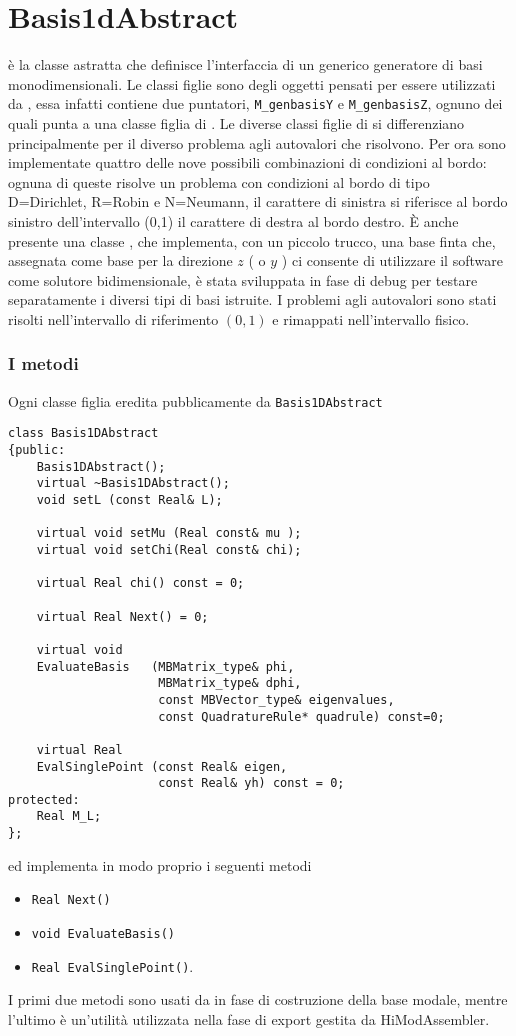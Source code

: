 \section{Basis1dAbstract}
 \`e la classe astratta che definisce l'interfaccia di un generico generatore di basi monodimensionali.
Le classi figlie sono degli oggetti pensati per essere utilizzati da , essa infatti contiene due puntatori, 
\texttt{M\_genbasisY} e \texttt{M\_genbasisZ}, ognuno dei quali punta a una classe figlia di .
Le diverse classi figlie di  si differenziano principalmente per il diverso problema agli autovalori che risolvono.
Per ora sono implementate quattro delle nove possibili combinazioni di condizioni al bordo:  
ognuna di queste risolve un problema con condizioni al bordo di tipo D=Dirichlet, R=Robin e N=Neumann, il carattere di sinistra 
si riferisce al bordo sinistro dell'intervallo (0,1) il carattere di destra al bordo destro. \`E anche presente una 
classe , che implementa, con un piccolo trucco, una base finta che, assegnata come base per la direzione
$z$ ( o $y$ ) ci consente di utilizzare il software come solutore bidimensionale, \`e stata sviluppata in fase di debug 
per testare separatamente i diversi tipi di basi istruite.
I problemi agli autovalori sono stati risolti nell'intervallo di riferimento $(0,1)$ e rimappati nell'intervallo fisico.
 
\subsubsection{I metodi}
Ogni classe figlia eredita pubblicamente da \texttt{Basis1DAbstract}
\begin{lstlisting}[style = general]
class Basis1DAbstract
{public:
    Basis1DAbstract();
    virtual ~Basis1DAbstract();
    void setL (const Real& L);
    
    virtual void setMu (Real const& mu );
    virtual void setChi(Real const& chi);
    
    virtual Real chi() const = 0;
    
    virtual Real Next() = 0;
    
    virtual void 
    EvaluateBasis   (MBMatrix_type& phi,
                     MBMatrix_type& dphi,
                     const MBVector_type& eigenvalues,
                     const QuadratureRule* quadrule) const=0;
    
    virtual Real 
    EvalSinglePoint (const Real& eigen,
                     const Real& yh) const = 0;	      
protected:
    Real M_L;
};
\end{lstlisting}
ed implementa in modo proprio i seguenti metodi
\begin{itemize}
\item \texttt{Real Next()} 
\item \texttt{void EvaluateBasis()}
\item \texttt{Real EvalSinglePoint()}.
\end{itemize}
I primi due metodi sono usati da  in fase di costruzione della base modale, mentre l'ultimo \`e un'utilit\`a
 utilizzata nella fase di export gestita da HiModAssembler.


